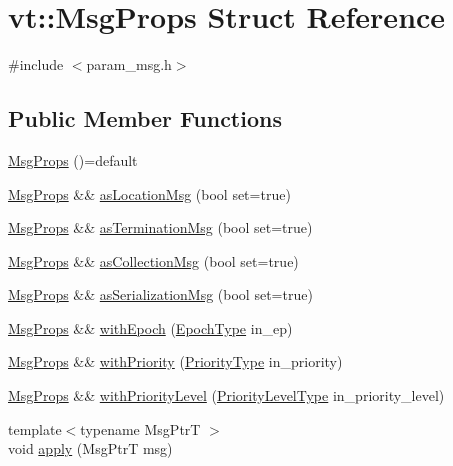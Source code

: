 \hypertarget{structvt_1_1_msg_props}{}\section{vt\+:\+:Msg\+Props Struct Reference}
\label{structvt_1_1_msg_props}


{\ttfamily \#include $<$param\+\_\+msg.\+h$>$}

\subsection*{Public Member Functions}
\begin{DoxyCompactItemize}
\item 
\hyperlink{structvt_1_1_msg_props_a3285b900d253d0dde3929bfb16ba102a}{Msg\+Props} ()=default
\item 
\hyperlink{structvt_1_1_msg_props}{Msg\+Props} \&\& \hyperlink{structvt_1_1_msg_props_a932470be5f02611a13ac4e1149823247}{as\+Location\+Msg} (bool set=true)
\item 
\hyperlink{structvt_1_1_msg_props}{Msg\+Props} \&\& \hyperlink{structvt_1_1_msg_props_ac66498ad91fdc55fd27bce13a7244f17}{as\+Termination\+Msg} (bool set=true)
\item 
\hyperlink{structvt_1_1_msg_props}{Msg\+Props} \&\& \hyperlink{structvt_1_1_msg_props_ac0c0bcfbee3c18f032b6703e88bce068}{as\+Collection\+Msg} (bool set=true)
\item 
\hyperlink{structvt_1_1_msg_props}{Msg\+Props} \&\& \hyperlink{structvt_1_1_msg_props_a7b5959d7809089fb2083ed82e4ae2bd5}{as\+Serialization\+Msg} (bool set=true)
\item 
\hyperlink{structvt_1_1_msg_props}{Msg\+Props} \&\& \hyperlink{structvt_1_1_msg_props_aa3e92f5466a771b0d2fc5ec0d8825695}{with\+Epoch} (\hyperlink{namespacevt_a81d11b28122d43bf9834577e4a06440f}{Epoch\+Type} in\+\_\+ep)
\item 
\hyperlink{structvt_1_1_msg_props}{Msg\+Props} \&\& \hyperlink{structvt_1_1_msg_props_af604c4dc6e52f45e9928037d7b22aa88}{with\+Priority} (\hyperlink{namespacevt_a86bff9f556eb761b27fc8600d006ac04}{Priority\+Type} in\+\_\+priority)
\item 
\hyperlink{structvt_1_1_msg_props}{Msg\+Props} \&\& \hyperlink{structvt_1_1_msg_props_a496b0dbbc9bc568dede79229801b913d}{with\+Priority\+Level} (\hyperlink{namespacevt_a53e07fdb3351b0f263e0dfd51b968d5e}{Priority\+Level\+Type} in\+\_\+priority\+\_\+level)
\item 
{\footnotesize template$<$typename Msg\+PtrT $>$ }\\void \hyperlink{structvt_1_1_msg_props_a412298bb043b186696ad457aa0a39422}{apply} (Msg\+PtrT msg)
\end{DoxyCompactItemize}
